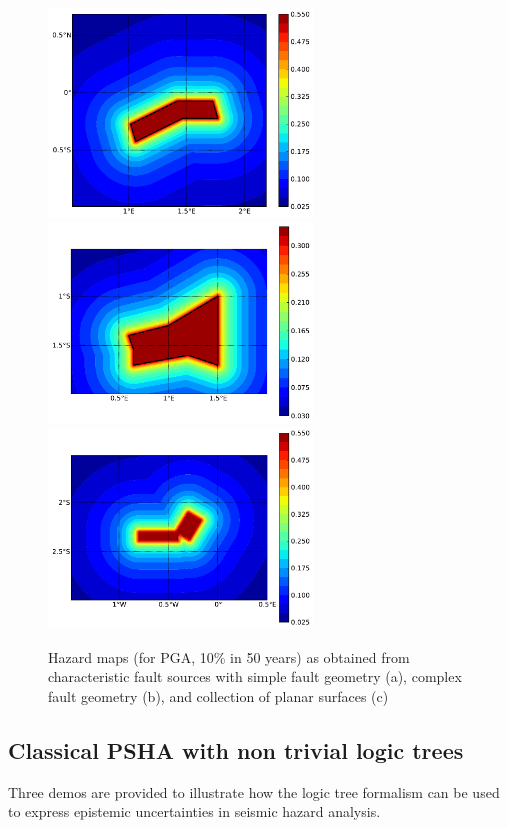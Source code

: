 \begin{figure} 
\centering 
\subcaptionbox{}
{\includegraphics[width=7cm]{figures/hazard/char_fault2.pdf}} 
\subcaptionbox{}
{\includegraphics[width=7cm]{figures/hazard/char_fault3.pdf}} 
\subcaptionbox{}
{\includegraphics[width=7cm]{figures/hazard/char_fault1.pdf}} 
\caption{Hazard maps (for PGA, 10\% in 50 years) as obtained from 
    characteristic fault sources with simple fault
    geometry (a), complex fault geometry (b), and collection of
    planar surfaces (c)}
\label{fig:hazard_maps2}
\end{figure}

\clearpage
\subsection{Classical PSHA with non trivial logic trees}

Three demos are provided to illustrate how the logic tree formalism can be
used to express epistemic uncertainties in seismic hazard analysis.

